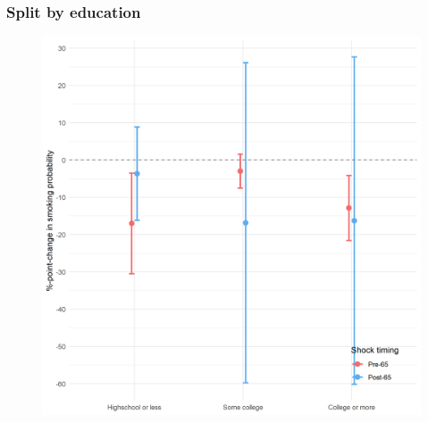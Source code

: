 \documentclass[10pt,compress,xcolor=dvipsnames,aspectratio=169]{beamer}    %
\newcounter{ex}
\newcommand{\1}[1]{\mathrm{1\hspace*{-2.5pt}l}[#1]}	%
\begin{document}
\begin{frame}
\frametitle{Split by education}

\begin{figure}[hbtp]
\centering
\includegraphics[height=0.8\textheight]{../../3_output/shock_effects/edu_6070_100_cv.png}
\label{fig:edu}
\end{figure}
\hyperlink{frame:otherX}{}
\end{frame}
\end{document}
